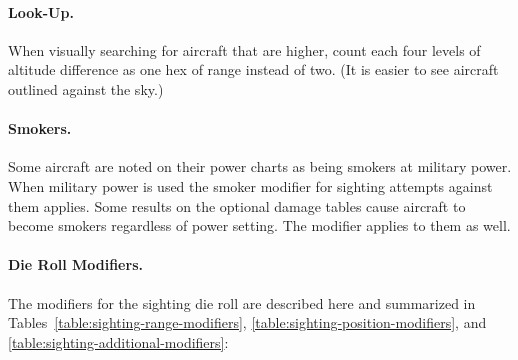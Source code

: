 {{\paragraph{Look-Up.} When visually searching for aircraft that are higher, count each four levels of altitude difference as one hex of range instead of two. (It is easier to see aircraft outlined against the sky.) 
\paragraph{Smokers.} Some aircraft are noted on their power charts as being smokers at military power. When military power is used the smoker modifier for sighting attempts against them applies. Some results on the optional damage tables cause aircraft to become smokers regardless of power setting. The modifier applies to them as well.
}
}{

\paragraph{Die Roll Modifiers.} The modifiers for the sighting die roll are described here and summarized in Tables~\ref{table:sighting-range-modifiers}, \ref{table:sighting-position-modifiers}, and \ref{table:sighting-additional-modifiers}:

}
